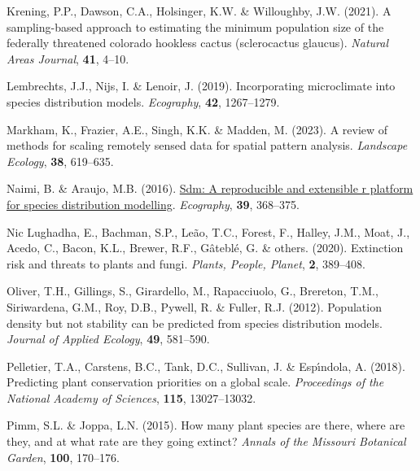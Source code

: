 \documentclass[
]{article}
\newlength{\cslhangindent}
\newlength{\cslentryspacingunit} %
\newenvironment{CSLReferences}[2] %
 {%
  \setlength{\parindent}{0pt}
  \ifodd #1
  \let\oldpar\par
  \def\par{\hangindent=\cslhangindent\oldpar}
  \fi
  \setlength{\parskip}{#2\cslentryspacingunit}
 }%
 {}
\begin{document}
\begin{CSLReferences}{1}{0}
\leavevmode{}%
Krening, P.P., Dawson, C.A., Holsinger, K.W. \& Willoughby, J.W. (2021).
A sampling-based approach to estimating the minimum population size of
the federally threatened colorado hookless cactus (sclerocactus
glaucus). \emph{Natural Areas Journal}, \textbf{41}, 4--10.

\leavevmode{}%
Lembrechts, J.J., Nijs, I. \& Lenoir, J. (2019). Incorporating
microclimate into species distribution models. \emph{Ecography},
\textbf{42}, 1267--1279.

\leavevmode{}%
Markham, K., Frazier, A.E., Singh, K.K. \& Madden, M. (2023). A review
of methods for scaling remotely sensed data for spatial pattern
analysis. \emph{Landscape Ecology}, \textbf{38}, 619--635.

\leavevmode{}%
Naimi, B. \& Araujo, M.B. (2016).
\href{https://doi.org/10.1111/ecog.01881}{Sdm: A reproducible and
extensible r platform for species distribution modelling}.
\emph{Ecography}, \textbf{39}, 368--375.

\leavevmode{}%
Nic Lughadha, E., Bachman, S.P., Leão, T.C., Forest, F., Halley, J.M.,
Moat, J., Acedo, C., Bacon, K.L., Brewer, R.F., Gâteblé, G. \& others.
(2020). Extinction risk and threats to plants and fungi. \emph{Plants,
People, Planet}, \textbf{2}, 389--408.

\leavevmode{}%
Oliver, T.H., Gillings, S., Girardello, M., Rapacciuolo, G., Brereton,
T.M., Siriwardena, G.M., Roy, D.B., Pywell, R. \& Fuller, R.J. (2012).
Population density but not stability can be predicted from species
distribution models. \emph{Journal of Applied Ecology}, \textbf{49},
581--590.

\leavevmode{}%
Pelletier, T.A., Carstens, B.C., Tank, D.C., Sullivan, J. \& Espı́ndola,
A. (2018). Predicting plant conservation priorities on a global scale.
\emph{Proceedings of the National Academy of Sciences}, \textbf{115},
13027--13032.

\leavevmode{}%
Pimm, S.L. \& Joppa, L.N. (2015). How many plant species are there,
where are they, and at what rate are they going extinct? \emph{Annals of
the Missouri Botanical Garden}, \textbf{100}, 170--176.


\end{CSLReferences}
\end{document}
